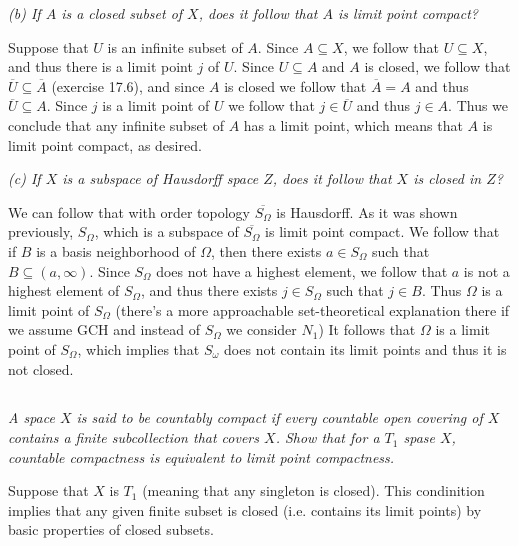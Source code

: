 \documentclass[11pt,oneside,titlepage]{book}
\begin{document}
\textit{(b) If $A$ is a closed subset of $X$, does it follow that $A$ is limit point
  compact?}

Suppose that $U$ is an infinite subset of $A$. Since $A \subseteq X$, we follow that
$U \subseteq X$, and thus there is a limit point $j$ of $U$. Since $U \subseteq A$
and $A$ is closed, we follow that $\overline{U} \subseteq \overline{A}$ (exercise 17.6),
and since $A$ is closed we follow that $\overline{A} = A$ and thus $\overline{U} \subseteq A$.
Since $j$ is a limit point of $U$ we follow that $j \in \overline{U}$ and thus $j \in A$.
Thus we conclude that any infinite subset of $A$ has a limit point, which means that
$A$ is limit point compact, as desired.

\textit{(c) If $X$ is a subspace of Hausdorff space $Z$, does it follow that $X$ is closed
  in $Z$?}

We can follow that with order topology $\overline{S_\Omega}$ is Hausdorff. As it was shown
previously, $S_\Omega$, which is a subspace of $\overline{S_\Omega}$ is limit point compact.
We follow that if $B$ is a basis neighborhood of $\Omega$, then there exists $a \in S_\Omega$
such that $B \subseteq (a, \infty)$. Since $S_\Omega$ does not have a highest element,
we follow that $a$ is not a highest element of $S_\Omega$, and thus there exists
$j \in S_\Omega$ such that $j \in B$. Thus $\Omega$ is a limit point of $S_\Omega$ (there's
a more approachable set-theoretical explanation there if we assume GCH and instead of $S_\Omega$ we
consider $N_1$) It follows that $\Omega$ is a limit point of $S_\Omega$,
which implies that $S_\omega$ does not contain its limit points and thus it is not closed.

\subsection{}

\textit{A space $X$ is said to be countably compact if every countable open covering
  of $X$ contains a finite subcollection that covers $X$. Show that for a $T_1$ spase $X$,
  countable compactness is equivalent to limit point compactness.}

Suppose that $X$ is $T_1$ (meaning that any singleton is closed). This condinition
implies that any given finite subset is closed (i.e. contains its limit points) by
basic properties of closed subsets.
\end{document}
